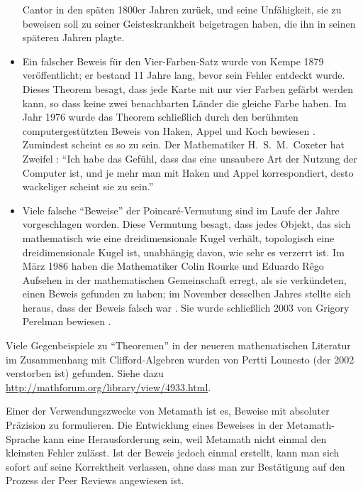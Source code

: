 \begin{itemize}
Cantor in den späten 1800er Jahren zurück, und seine Unfähigkeit, sie zu beweisen soll zu seiner Geisteskrankheit beigetragen haben, die ihn in seinen späteren
Jahren plagte.
\item Ein falscher Beweis für den Vier-Farben-Satz wurde von Kempe 1879 veröffentlicht\cite[S.~582]{Courant}; er bestand 11 Jahre lang, bevor sein Fehler entdeckt wurde.  Dieses Theorem besagt, dass jede Karte mit nur vier Farben gefärbt werden kann, so dass keine zwei benachbarten Länder die gleiche Farbe haben.
Im Jahr 1976 wurde das Theorem schließlich durch den berühmten computergestützten Beweis von Haken, Appel und Koch bewiesen \cite{Swart}.  Zumindest scheint es so zu sein.  Der Mathematiker H.~S.~M.~Coxeter hat Zweifel \cite[S.~58]{Davis}:  "`Ich habe das Gefühl, dass das eine unsaubere Art der Nutzung der Computer ist, und je mehr man mit Haken und Appel korrespondiert, desto wackeliger scheint sie zu sein."'
\item Viele falsche "`Beweise"' der Poincar\'{e}-Vermutung sind im Laufe der Jahre vorgeschlagen worden.  Diese Vermutung besagt, dass jedes Objekt, das sich mathematisch wie eine dreidimensionale Kugel verhält, topologisch eine dreidimensionale Kugel ist, unabhängig davon, wie sehr es verzerrt ist.  Im März 1986 haben die Mathematiker Colin Rourke und Eduardo R\^{e}go Aufsehen in der mathematischen Gemeinschaft erregt, als sie verkündeten, einen Beweis gefunden zu haben; im November desselben Jahres stellte sich heraus, dass der Beweis falsch war \cite[S.218]{PetersonI}.  Sie wurde schließlich 2003 von Grigory Perelman bewiesen \label{poincare}\cite{Szpiro}.
 \end{itemize}

Viele Gegenbeispiele zu "`Theoremen"' in der neueren mathematischen Literatur im Zusammenhang mit Clifford-Algebren wurden von Pertti Lounesto (der 2002 verstorben ist) gefunden. Siehe dazu \url{http://mathforum.org/library/view/4933.html}.

Einer der Verwendungszwecke von Metamath ist es, Beweise mit absoluter Präzision zu formulieren.  Die Entwicklung eines Beweises in der Metamath-Sprache kann eine Herausforderung sein, weil Metamath nicht einmal den kleinsten Fehler zulässt.  Ist der Beweis jedoch einmal erstellt, kann man sich sofort auf seine Korrektheit verlassen, ohne dass man zur Bestätigung auf den Prozess der Peer Reviews angewiesen ist.

